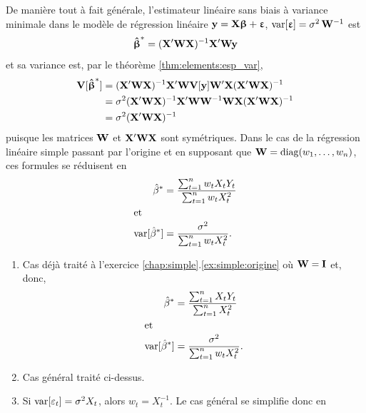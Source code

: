 \begin{solution}{3.15}
    De manière tout à fait générale, l'estimateur linéaire sans biais
    à variance minimale dans le modèle de régression linéaire $\mathbf{y}
    = \mathbf{X} \boldsymbol{\upbeta} + \boldsymbol{\upvarepsilon}$, $\mathrm{var} [ \boldsymbol{\upvarepsilon} ] = \sigma^2\,
    \mathbf{W}^{-1}$ est
    \begin{displaymath}
      \boldsymbol{\hat{\upbeta}}^* = (\mathbf{X}^\prime \mathbf{W} \mathbf{X})^{-1} \mathbf{X}^\prime
      \mathbf{W} \mathbf{y}
    \end{displaymath}
    et sa variance est, par le théorème \ref{thm:elements:esp_var},
    \begin{align*}
      \mathbf{V} [ \boldsymbol{\hat{\upbeta}}^* ]
      &= (\mathbf{X}^\prime \mathbf{W} \mathbf{X})^{-1} \mathbf{X}^\prime \mathbf{W}
      \mathbf{V} [ \mathbf{y} ]
      \mathbf{W}^\prime \mathbf{X} (\mathbf{X}^\prime \mathbf{W} \mathbf{X})^{-1} \\
      &= \sigma^2
      (\mathbf{X}^\prime \mathbf{W} \mathbf{X})^{-1} \mathbf{X}^\prime \mathbf{W}
      \mathbf{W}^{-1}
      \mathbf{W} \mathbf{X} (\mathbf{X}^\prime \mathbf{W} \mathbf{X})^{-1} \\
      &= \sigma^2 (\mathbf{X}^\prime \mathbf{W} \mathbf{X})^{-1}
    \end{align*}
    puisque les matrices $\mathbf{W}$ et $\mathbf{X}^\prime \mathbf{W} \mathbf{X}$
    sont symétriques. Dans le cas de la régression linéaire simple
    passant par l'origine et en supposant que $\mathbf{W} = \mathrm{diag}(w_1,
    \dots, w_n)$, ces formules se réduisent en
    \begin{align*}
      \hat{\beta}^*
      &= \frac{\sum_{t=1}^n w_t X_t Y_t}{\sum_{t=1}^n w_t X_t^2} \\
      \intertext{et}
      \mathrm{var} [ \hat{\beta}^* ]
      &= \frac{\sigma^2}{\sum_{t=1}^n w_t X_t^2}.
    \end{align*}
    \begin{enumerate}
    \item Cas déjà traité à l'exercice
      \ref{chap:simple}.\ref{ex:simple:origine} où $\mathbf{W} = \mathbf{I}$
      et, donc,
      \begin{align*}
        \hat{\beta}^*
        &= \frac{\sum_{t=1}^n X_t Y_t}{\sum_{t=1}^n X_t^2} \\
        \intertext{et}
        \mathrm{var} [ \hat{\beta}^* ]
        &= \frac{\sigma^2}{\sum_{t=1}^n w_t X_t^2}.
      \end{align*}
    \item Cas général traité ci-dessus.
    \item Si $\mathrm{var} [ \varepsilon_t ] = \sigma^2 X_t$, alors $w_t =
      X_t^{-1}$. Le cas général se simplifie donc en
      \begin{align*}

\end{align*}
\end{enumerate}
\end{solution}
